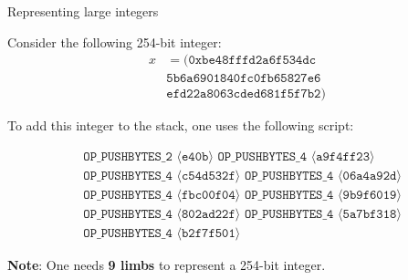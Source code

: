 \documentclass{zkdl-presentation-template}
\newcommand{\elem}[1]{\, \langle #1 \rangle \,}
\newcommand{\opcode}[1]{\, \texttt{#1} \,}
\begin{document}
    \begin{frame}{Representing large integers}
        \begin{example}
            Consider the following 254-bit integer:
            \begin{align*}
                x &= (\mathtt{0xbe48fffd2a6f534dc} \\ &\mathtt{5b6a6901840fc0fb65827e6} \\
                &\mathtt{efd22a8063cded681f5f7b2})
            \end{align*}

            To add this integer to the stack, one uses the following script:
            \begin{empheqboxed}
            \scriptsize
            \begin{align*}
               &\opcode{OP\_PUSHBYTES\_2} \elem{\mathtt{e40b}} \opcode{OP\_PUSHBYTES\_4} \elem{\mathtt{a9f4ff23}}
               \\ 
               &\opcode{OP\_PUSHBYTES\_4} \elem{\mathtt{c54d532f}} \opcode{OP\_PUSHBYTES\_4} \elem{\mathtt{06a4a92d}}
               \\
               &\opcode{OP\_PUSHBYTES\_4} \elem{\mathtt{fbc00f04}} \opcode{OP\_PUSHBYTES\_4} \elem{\mathtt{9b9f6019}}
               \\
               &\opcode{OP\_PUSHBYTES\_4} \elem{\mathtt{802ad22f}} 
               \opcode{OP\_PUSHBYTES\_4} \elem{\mathtt{5a7bf318}}
               \\
               &\opcode{OP\_PUSHBYTES\_4} \elem{\mathtt{b2f7f501}}
            \end{align*}
          \end{empheqboxed}
          \textbf{Note}: One needs \textbf{9 limbs} to represent a 254-bit integer.
        \end{example}
    \end{frame}
\end{document}
